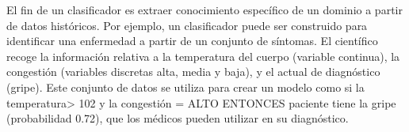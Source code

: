 	El fin de un clasificador es extraer conocimiento específico de un dominio a partir de datos históricos. Por ejemplo, un clasificador puede ser construido para identificar una enfermedad a partir de un conjunto de síntomas. El científico recoge la información relativa a la temperatura del cuerpo (variable continua), la congestión (variables discretas alta, media y baja), y el actual de diagnóstico (gripe). Este conjunto de datos se utiliza para crear un modelo como si la temperatura> 102 y la congestión = ALTO ENTONCES paciente tiene la gripe (probabilidad 0.72), que los médicos pueden utilizar en su diagnóstico.






